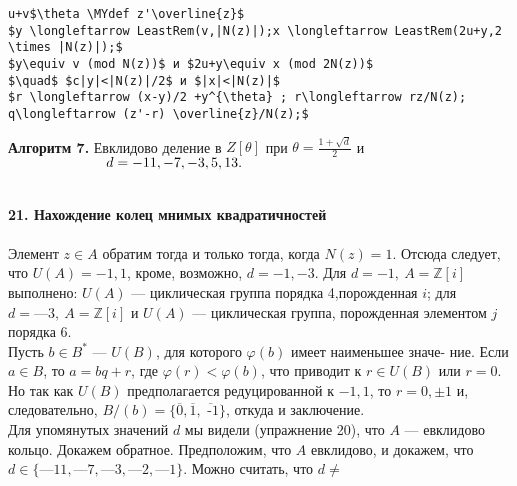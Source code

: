 \begin{lstlisting}[mathescape=true]
u+v$\theta \MYdef z'\overline{z}$
$y \longleftarrow LeastRem(v,|N(z)|);x \longleftarrow LeastRem(2u+y,2 \times |N(z)|);$
$y\equiv v (mod N(z))$ и $2u+y\equiv x (mod 2N(z))$
$\quad$ $c|y|<|N(z)|/2$ и $|x|<|N(z)|$
$r \longleftarrow (x-y)/2 +y^{\theta} ; r\longleftarrow rz/N(z); q\longleftarrow (z'-r) \overline{z}/N(z);$
\end{lstlisting}
\begin{center}
\parbox{10cm}{
{\bf Алгоритм 7.} Евклидово деление в $Z[\theta]$ при $\theta = \frac{1+\sqrt{d}}2$ и 
 $\hspace*{70pt} d = -11, -7, -3, 5, 13.$}
\end{center}
\ \\
\noindent\textbf{21. Нахождение колец мнимых квадратичностей}\\
\\
\hspace*{15pt}{\bf a.} Элемент $z\in A$ обратим тогда и только тогда, когда $N(z)=1$.\linebreak
Отсюда следует, что $U(A)={-1,1}$, кроме, возможно, $d=-1,-3$. Для\linebreak
$d=-1,~A=\mathbb{Z}[i]$ выполнено: $U(A)$ — циклическая группа порядка 4,\linebreak порожденная $i$; для $d=—3,~A=\mathbb{Z}[i]$ и $U(A)$ — циклическая группа,\linebreak 
порожденная элементом $j$ порядка 6.\newline
\\
\hspace*{15pt}{\bf b.} Пусть $b\in B^{\ast}$ — $U(B)$, для которого $\varphi(b)$ имеет наименьшее значе-\linebreak
ние. Если $a\in B$, то $a = bq + r$, где $\varphi(r)<\varphi(b)$, что приводит к $r\in U(B)$\linebreak
или $r=0$. Но так как $U(B)$ предполагается редуцированной к ${-1,1}$,\linebreak 
то $r=0,\pm1$ и, следовательно, $B/(b)=\{\overline{\mbox{0}},\overline{\mbox{1}},\overline{\mbox{ -1}}\}$, откуда и заключение.\newline
\\
\hspace*{15pt}{\bf c.} Для упомянутых значений $d$ мы видели (упражнение 20), что $A$ —\linebreak
евклидово кольцо. Докажем обратное. Предположим, что $A$ евклидово, и докажем, что $d\in\{ —11, —7, —3, —2, —1\}$. Можно считать, что $d\neq$\linebreak

